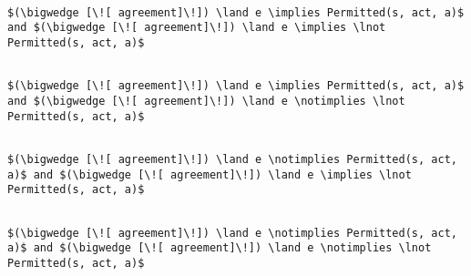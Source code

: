 \lstset{mathescape, language=AST} 
\begin{lstlisting}[frame=single, caption={Answerable Queries: Error},label={lst:errordecision}]

$(\bigwedge [\![ agreement]\!]) \land e \implies Permitted(s, act, a)$ and $(\bigwedge [\![ agreement]\!]) \land e \implies \lnot Permitted(s, act, a)$

\end{lstlisting}

\lstset{mathescape, language=AST} 
\begin{lstlisting}[frame=single, caption={Answerable Queries: Permit},label={lst:permitdecision}]

$(\bigwedge [\![ agreement]\!]) \land e \implies Permitted(s, act, a)$ and $(\bigwedge [\![ agreement]\!]) \land e \notimplies \lnot Permitted(s, act, a)$

\end{lstlisting}

\lstset{mathescape, language=AST} 
\begin{lstlisting}[frame=single, caption={Answerable Queries: Deny},label={lst:denydecision}]

$(\bigwedge [\![ agreement]\!]) \land e \notimplies Permitted(s, act, a)$ and $(\bigwedge [\![ agreement]\!]) \land e \implies \lnot Permitted(s, act, a)$

\end{lstlisting}

\lstset{mathescape, language=AST} 
\begin{lstlisting}[frame=single, caption={Answerable Queries: Not Applicable},label={lst:notapplicabledecision}]

$(\bigwedge [\![ agreement]\!]) \land e \notimplies Permitted(s, act, a)$ and $(\bigwedge [\![ agreement]\!]) \land e \notimplies \lnot Permitted(s, act, a)$

\end{lstlisting}





















